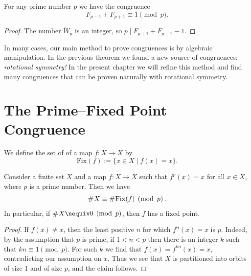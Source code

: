 \begin{corollary}\label{corollary:congruence-lucas-numbers-mod-p}
  For any prime number $p$ we have the congruence
  \begin{equation*}
    F_{p-1}+F_{p+1}\equiv 1\pmod{p}.
  \end{equation*}
\end{corollary}

\begin{proof}
  The number $\tilde{W}_p$ is an integer, so $p\mid F_{p+1}+F_{p-1}-1$.
\end{proof}

In many cases, our main method to prove congruences is by algebraic manipulation. In the previous theorem we found a new source of congruences: \emph{rotational symmetry!} In the present chapter we will refine this method and find many congruences that can be proven naturally with rotational symmetry.

\section{The Prime--Fixed Point Congruence}

\begin{definition}
  We define the set of  of a map $f:X\to X$ by
  \begin{equation*}
    \mathrm{Fix}(f):= \{x\in X\mid f(x)=x\}.
  \end{equation*}
\end{definition}

\begin{theorem}\label{theorem:prime-fixed-point-congruence}
  Consider a finite set $X$ and a map $f:X\to X$ such that $f^p(x)=x$ for all $x\in X$, where $p$ is a prime number. Then we have
  \begin{equation*}
    \mathord{\#}\mkern1mu X \equiv \mathord{\#}\mkern1mu \mathrm{Fix}(f) \mkern5mu\left(\operatorname{mod} \mkern 6mu p\right).
  \end{equation*}
  In particular, if $\cardinality{X} \nequiv 0\pmod{p}$, then $f$ has a fixed point.
\end{theorem}

\begin{proof}
  If $f(x)\neq x$, then the least positive $n$ for which $f^n(x)=x$ is $p$. Indeed, by the assumption that $p$ is prime, if $1<n<p$ then there is an integer $k$ such that $kn\equiv 1\pmod p$. For such $k$ we find that $f(x)=f^{kn}(x)=x$, contradicting our assumption on $x$. Thus we see that $X$ is partitioned into orbits of size $1$ and of size $p$, and the claim follows.
\end{proof}

